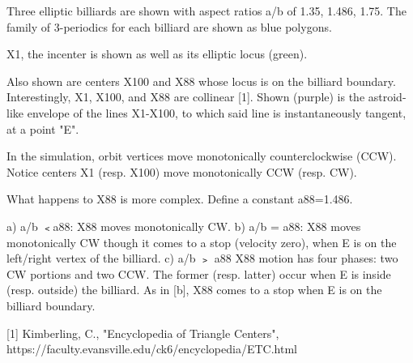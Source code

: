 Three elliptic billiards are shown with aspect ratios a/b of 1.35, 1.486, 1.75. The family of 3-periodics for each billiard are shown as blue polygons.

X1, the incenter is shown as well as its elliptic locus (green).

Also shown are centers X100 and X88 whose locus is on the billiard boundary. Interestingly, X1, X100, and X88 are collinear [1].  Shown (purple) is the astroid-like envelope of the lines X1-X100, to which said line is instantaneously tangent, at a point "E".

In the simulation, orbit vertices move monotonically counterclockwise (CCW). Notice centers X1 (resp. X100) move monotonically CCW (resp. CW).

What happens to X88 is more complex. Define a constant a88=1.486.

a) a/b ﹤a88: X88 moves monotonically CW.
b) a/b = a88: X88 moves monotonically CW though it comes to a stop (velocity zero), when E is on the left/right vertex of the billiard.
c) a/b ﹥ a88 X88 motion has four phases: two CW portions and two CCW. The former (resp. latter) occur when E is inside (resp. outside) the billiard. As in [b], X88 comes to a stop when E is on the billiard boundary.

[1] Kimberling, C., "Encyclopedia of Triangle Centers", https://faculty.evansville.edu/ck6/encyclopedia/ETC.html